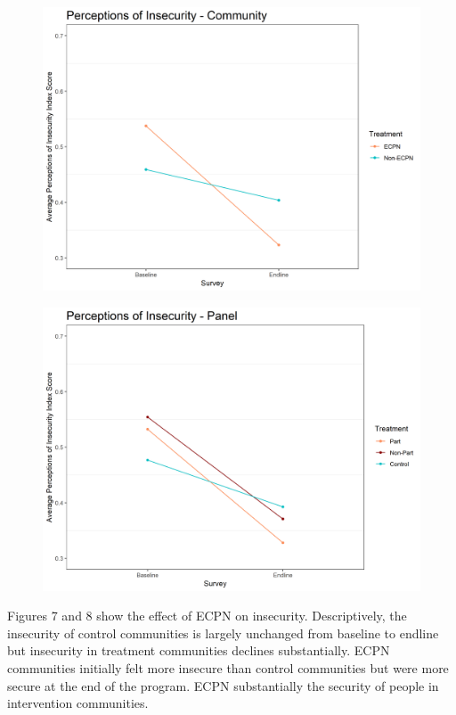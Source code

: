 \documentclass[11pt]{article}
\begin{document}
\begin{figure}[!h]
    \begin{minipage}[b]{.48\textwidth}
        \includegraphics[width=\linewidth]{../../figs/inComm_plot.png}
        \label{fig:fig7}
    \end{minipage}
    \hfill
    \begin{minipage}[b]{.48\textwidth}
        \includegraphics[width=\linewidth]{../../figs/inPan_plot.png}
        \label{fig:fig8}
    \end{minipage}
\end{figure}

Figures 7 and 8 show the effect of ECPN on insecurity. Descriptively,
the insecurity of control communities is largely unchanged from baseline
to endline but insecurity in treatment communities declines
substantially. ECPN communities initially felt more insecure than
control communities but were more secure at the end of the program. ECPN
substantially the security of people in intervention communities.
\end{document}

